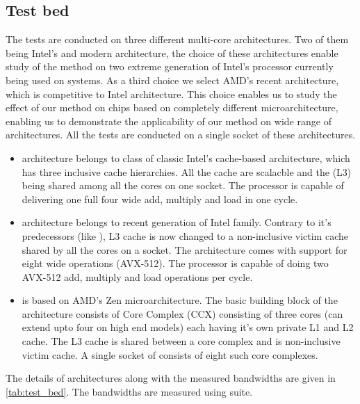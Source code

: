 \subsection{Test bed}
The tests are conducted on three different multi-core architectures. Two of them being Intel's \IVB and modern \SKX architecture, the choice of these architectures enable study of the method on two extreme generation of Intel's processor currently being used on \HPC systems. As a third choice we select AMD's recent \EPY architecture, which is competitive to Intel \SKX architecture. This choice enables us to study the effect of our method on chips based on completely different microarchitecture, enabling us to demonstrate the applicability of our method on wide range of architectures. All the tests are conducted on a single socket of these architectures. 

\begin{itemize}
	\item \Intel \IVB architecture belongs to class of classic Intel's cache-based architecture, which has three inclusive cache  hierarchies. All the cache are scalacble and the \LLC (L3) being shared among all the cores on one socket. The processor is capable of delivering one full four wide \SIMD add, multiply and load in one cycle. 
	\item \Intel \SKX architecture belongs to recent generation of Intel family. Contrary to it's predecessors (like \IVB), L3 cache is now changed to a non-inclusive victim cache shared by all the cores on a socket. The architecture comes with support for eight wide \SIMD operations (AVX-512). The processor is capable of doing two AVX-512 add, multiply and load operations per cycle.
	\item \AMD \EPY is based on AMD's Zen microarchitecture. The basic building block of the architecture consists of Core Complex (CCX) consisting of three cores (can extend upto four on high end models) each having it's own private L1 and L2 cache. The L3 cache is shared between a core complex and is non-inclusive victim cache. A single socket of \EPY consists of eight such core complexes.
	
\end{itemize}
The details of architectures along with the measured bandwidths are given in \cref{tab:test_bed}. The bandwidths are measured using \likwidBench suite.


